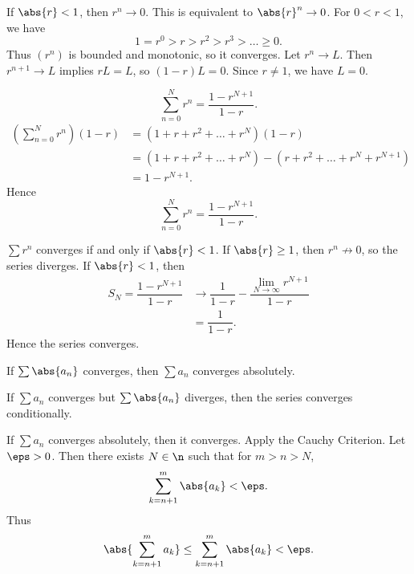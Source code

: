 \begin{lemma}{
    If $\abs{r} < 1$, then $r^n\to 0$.
}
    This is equivalent to $\abs{r}^n\to 0$.
    For $0 < r < 1$, we have
    \[
        1 = r^0 > r > r^2 > r^3 > \ldots \geq 0.
    \]
    Thus $(r^n)$ is bounded and monotonic, so it converges.
    Let $r^n \to L$.
    Then $r^{n+1}\to L$ implies $rL = L$, so $(1-r)L = 0$.
    Since $r\neq 1$, we have $L = 0$.
\end{lemma}

\begin{lemma}{
    \[
        \sum_{n=0}^N r^n = \dfrac{1 - r^{N+1}}{1-r}.
    \]
}
    \begin{align*}
        \left(\sum_{n=0}^N r^n\right) (1-r)
        &= (1 + r + r^2 + \ldots + r^N)(1 - r)\\
        &= (1 + r + r^2 + \ldots + r^N) - (r + r^2 + \ldots + r^N + r^{N+1})\\
        &= 1 - r^{N+1}.
    \end{align*}
    Hence
    \[
        \sum_{n=0}^N r^n = \dfrac{1 - r^{N+1}}{1-r}.
    \]
\end{lemma}

\begin{theorem}{
    $\sum r^n$ converges if and only if $\abs{r} < 1$.
}
    If $\abs{r}\geq 1$, then $r^n \not\to 0$, so the series diverges.
    If $\abs{r} < 1$, then
    \begin{align*}
        S_N = \dfrac{1 - r^{N+1}}{1-r}
        &\to \dfrac{1}{1-r} - \dfrac{\lim\limits_{N\to\infty} r^{N+1}}{1 -r}\\
        &= \dfrac{1}{1-r}.
    \end{align*}
    Hence the series converges.
\end{theorem}

\begin{definition}
    If $\sum \abs{a_n}$ converges, then $\sum a_n$ converges absolutely.
\end{definition}

\begin{definition}
    If $\sum a_n$ converges but $\sum \abs{a_n}$ diverges, then the series converges conditionally.
\end{definition}

\begin{theorem}{
    If $\sum a_n$ converges absolutely, then it converges.
}
    Apply the Cauchy Criterion.
    Let $\eps > 0$.
    Then there exists $N\in\n$ such that for $m > n > N$,
    \[
        \sum_{k=n+1}^m \abs{a_k} < \eps.
    \]
    Thus
    \[
        \abs{\sum_{k=n+1}^m a_k}\leq \sum_{k=n+1}^m \abs{a_k} < \eps.
    \]
\end{theorem}

